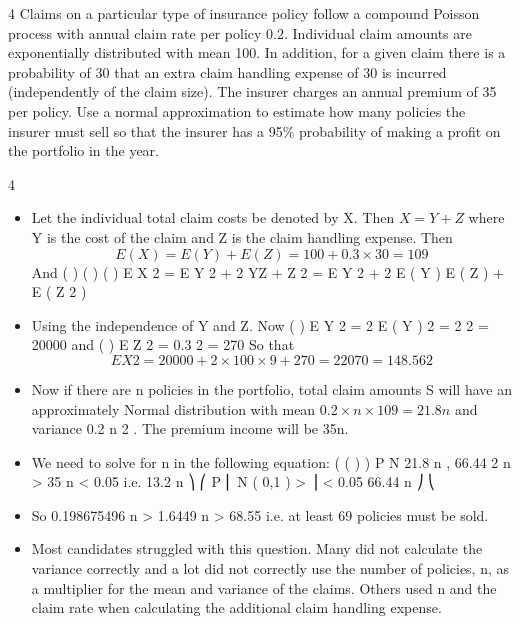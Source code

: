 \documentclass[a4paper,12pt]{article}
\begin{document}
4
Claims on a particular type of insurance policy follow a compound Poisson process with annual claim rate per policy 0.2. Individual claim amounts are exponentially distributed with mean 100. In addition, for a given claim there is a probability of 30%
that an extra claim handling expense of 30 is incurred (independently of the claim size). The insurer charges an annual premium of 35 per policy.
Use a normal approximation to estimate how many policies the insurer must sell so that the insurer has a 95\% probability of making a profit on the portfolio in the year.

\newpage

4
\begin{itemize}
\item Let the individual total claim costs be denoted by X. 
Then $X=Y+Z$ where Y is the cost of the claim and Z is the claim handling expense.
Then
\[E ( X ) = E ( Y ) + E ( Z ) = 100 + 0.3 \times 30 = 109\]
And
( ) (
) ( )
E X 2 = E Y 2 + 2 YZ + Z 2 = E Y 2 + 2 E ( Y ) E ( Z ) + E ( Z 2 )
\item  Using the independence of Y and Z. Now
( )
E Y 2 = 2 E ( Y ) 2 = 2  2 = 20000
and
( )
E Z 2 = 0.3  2 = 270
So that
\[
E X 2 = 20000 + 2 \times 100 \times 9 + 270 = 22070 = 148.56 2\]
\item  Now if there are n policies in the portfolio, total claim amounts S will have an approximately Normal distribution with mean $0.2 \times n \times 109 = 21.8 n$ and variance 0.2 \times n  2 .
The premium income will be 35n.

\item  We need to solve for n in the following equation:
( (
)
)
P N 21.8 n , 66.44 2 n > 35 n < 0.05
i.e.
13.2 n ⎞
⎛
P ⎜ N ( 0,1 ) >
⎟ < 0.05
66.44 n ⎠
⎝
\item  So
0.198675496 n > 1.6449
n > 68.55
i.e. at least 69 policies must be sold.
\item  Most candidates struggled with this question. Many did not calculate the variance correctly and a lot did not correctly use the number of policies, n, as a multiplier for the mean and variance of the claims. Others used n and the claim rate when calculating the additional
claim handling expense.
\end{itemize}
\end{document}
